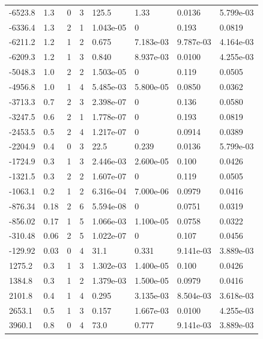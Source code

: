 \documentclass[preview]{standalone}
\begin{document}
{{\begin{tabular}{L{1.2cm}C{1.2cm} C{0.3cm}C{0.5cm} C{1.4cm}C{1.4cm} C{1.4cm}C{1.4cm}}
  -6523.8  &   1.3  & 0     &  3 &  125.5  & 1.33  & 0.0136 &  5.799e-03   \\ 
  -6336.4  &   1.3  & 2     &  1 &  1.043e-05  & 0  & 0.193 &  0.0819   \\ 
  -6211.2  &   1.2  & 1     &  2 &  0.675  & 7.183e-03  & 9.787e-03 &  4.164e-03   \\ 
  -6209.3  &   1.2  & 1     &  3 &  0.840  & 8.937e-03  & 0.0100 &  4.255e-03   \\ 
  -5048.3  &   1.0  & 2     &  2 &  1.503e-05  & 0  & 0.119 &  0.0505   \\ 
  -4956.8  &   1.0  & 1     &  4 &  5.485e-03  & 5.800e-05  & 0.0850 &  0.0362   \\ 
  -3713.3  &   0.7  & 2     &  3 &  2.398e-07  & 0  & 0.136 &  0.0580   \\ 
  -3247.5  &   0.6  & 2     &  1 &  1.778e-07  & 0  & 0.193 &  0.0819   \\ 
  -2453.5  &   0.5  & 2     &  4 &  1.217e-07  & 0  & 0.0914 &  0.0389   \\ 
  -2204.9  &   0.4  & 0     &  3 &  22.5  & 0.239  & 0.0136 &  5.799e-03   \\ 
  -1724.9  &   0.3  & 1     &  3 &  2.446e-03  & 2.600e-05  & 0.100 &  0.0426   \\ 
  -1321.5  &   0.3  & 2     &  2 &  1.607e-07  & 0  & 0.119 &  0.0505   \\ 
  -1063.1  &   0.2  & 1     &  2 &  6.316e-04  & 7.000e-06  & 0.0979 &  0.0416   \\ 
  -876.34  &  0.18  & 2     &  6 &  5.594e-08  & 0  & 0.0751 &  0.0319   \\ 
  -856.02  &  0.17  & 1     &  5 &  1.066e-03  & 1.100e-05  & 0.0758 &  0.0322   \\ 
  -310.48  &  0.06  & 2     &  5 &  1.022e-07  & 0  & 0.107 &  0.0456   \\ 
  -129.92  &  0.03  & 0     &  4 &  31.1  & 0.331  & 9.141e-03 &  3.889e-03   \\ 
  1275.2  &   0.3  & 1     &  3 &  1.302e-03  & 1.400e-05  & 0.100 &  0.0426   \\ 
  1384.8  &   0.3  & 1     &  2 &  1.379e-03  & 1.500e-05  & 0.0979 &  0.0416   \\ 
  2101.8  &   0.4  & 1     &  4 &  0.295  & 3.135e-03  & 8.504e-03 &  3.618e-03   \\ 
  2653.1  &   0.5  & 1     &  3 &  0.157  & 1.667e-03  & 0.0100 &  4.255e-03   \\ 
  3960.1  &   0.8  & 0     &  4 &  73.0  & 0.777  & 9.141e-03 &  3.889e-03   \\ 

\end{tabular}}}
\end{document}
